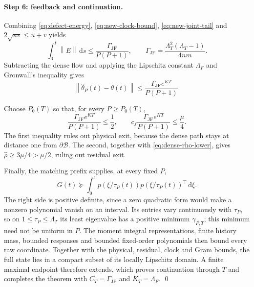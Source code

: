 \documentclass[11pt]{article}
\theoremstyle{definition}
\theoremstyle{remark}
\newcommand{\norm}[1]{\left\lVert #1\right\rVert}
\newcommand{\dd}{\,\mathrm{d}}
\begin{document}
\paragraph{Step 6: feedback and continuation.}
Combining \eqref{eq:defect-energy}, \eqref{eq:new-clock-bound},
\eqref{eq:new-joint-tail} and $2\sqrt{uv}\le u+v$ yields
\begin{equation}
 \int_0^t\norm E\dd s
 \le\frac{\Gamma_{\mathrm{JF}}}{P(P+1)},\qquad
 \Gamma_{\mathrm{JF}}=\frac{\Lambda_T^2(\Lambda_T-1)}{4nm}.     \label{eq:new-sharp-defect}
\end{equation}
Subtracting the dense flow and applying the Lipschitz constant $\Lambda_F$ and Gronwall's
inequality gives
\begin{equation}
 \norm{\widehat\theta_P(t)-\theta(t)}
 \le\frac{\Gamma_{\mathrm{JF}}e^{KT}}{P(P+1)}.                  \label{eq:new-feedback}
\end{equation}

Choose $P_0(T)$ so that, for every $P\ge P_0(T)$,
\begin{equation}
 \frac{\Gamma_{\mathrm{JF}}e^{KT}}{P(P+1)}\le\frac12,\qquad
 c_f\frac{\Gamma_{\mathrm{JF}}e^{KT}}{P(P+1)}\le\frac\mu4.      \label{eq:new-order-condition}
\end{equation}
The first inequality rules out physical exit, because the dense path stays at
distance one from $\partial\mathcal B$.  The second, together with
\eqref{eq:dense-rho-lower}, gives $\widehat\rho\ge3\mu/4>\mu/2$, ruling out
residual exit.

Finally, the matching prefix supplies, at every fixed $P$,
\begin{equation}
 G(t)\succeq\int_0^1p(\xi/\tau_P(t))p(\xi/\tau_P(t))^\top\dd\xi. \label{eq:prefix-gram}
\end{equation}
The right side is positive definite, since a zero quadratic form would make a
nonzero polynomial vanish on an interval.  Its entries vary continuously with
$\tau_P$, so on $1\le \tau_P\le\Lambda_T$ its least eigenvalue has a positive minimum
$\gamma_{P,T}$; this minimum need not be uniform in $P$.  The moment integral
representations, finite history mass, bounded responses and bounded
fixed-order polynomials then bound every raw coordinate.  Together with the
physical, residual, clock and Gram bounds, the full state lies in a compact
subset of its locally Lipschitz domain.  A finite maximal endpoint therefore
extends, which proves continuation through $T$ and completes the theorem with
$C_T=\Gamma_{\mathrm{JF}}$ and $K_T=\Lambda_F$. \qed
\end{document}
